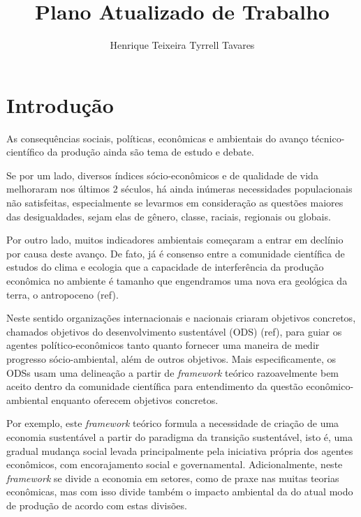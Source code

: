 \documentclass[14pt,a4paper]{article}
\title{Plano Atualizado de Trabalho}
\author{Henrique Teixeira Tyrrell Tavares}
\begin{document}
	
	\maketitle
	
	\begin{abstract}
		
	\end{abstract}
	
	\section{Introdução}
	
	As consequências sociais, políticas, econômicas e ambientais do avanço técnico-científico da produção ainda são tema de estudo e debate. 
	
	Se por um lado, diversos índices sócio-econômicos e de qualidade de vida melhoraram nos últimos $2$ séculos, há ainda inúmeras necessidades populacionais não satisfeitas, especialmente se levarmos em consideração as questões maiores das desigualdades, sejam elas de gênero, classe, raciais, regionais ou globais. 
	
	Por outro lado, muitos indicadores ambientais começaram a entrar em declínio por causa deste avanço. De fato, já é consenso entre a comunidade científica de estudos do clima e ecologia que a capacidade de interferência da produção econômica no ambiente é tamanho que engendramos uma nova era geológica da terra, o antropoceno (ref).
	
	Neste sentido organizações internacionais e nacionais criaram objetivos concretos, chamados objetivos do desenvolvimento sustentável (ODS) (ref), para guiar os agentes político-econômicos tanto quanto fornecer uma maneira de medir progresso sócio-ambiental, além de outros objetivos. Mais especificamente, os ODSs usam uma delineação a partir de \textit{framework} teórico razoavelmente bem aceito dentro da comunidade científica para entendimento da questão econômico-ambiental enquanto oferecem objetivos concretos. 
	
	Por exemplo, este \textit{framework} teórico formula a necessidade de criação de uma economia sustentável a partir do paradigma da transição sustentável, isto é, uma gradual mudança social levada principalmente pela iniciativa própria dos agentes econômicos, com encorajamento social e governamental. Adicionalmente, neste \textit{framework} se divide a economia em setores, como de praxe nas muitas teorias econômicas, mas com isso divide também o impacto ambiental da do atual modo de produção de acordo com estas divisões.
	
\end{document}
